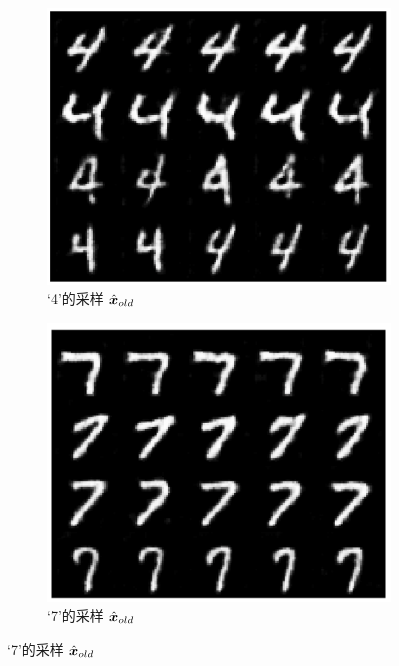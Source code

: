 \documentclass[../../book-main.tex]{subfiles}
\begin{document}
\begin{figure}[t]
    \begin{subfigure}[t]{0.20\textwidth}
        \centering
        \includegraphics[width=\textwidth]{figs_chap6/mnist_4.png}
        \caption{‘4’的采样 $\hat{\bm{x}}_{old}$}
    \end{subfigure}
    \hfill
    \begin{subfigure}[t]{0.20\textwidth}
        \centering
        \includegraphics[width=\textwidth]{figs_chap6/mnist_7.png}
        \caption{‘7’的采样 $\hat{\bm{x}}_{old}$}
    \end{subfigure}

\end{figure}
\end{document}

